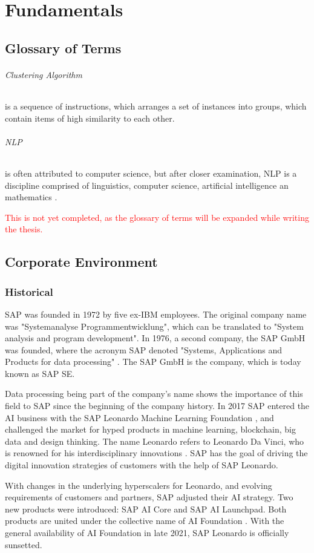 \chapter{Fundamentals}
\section{Glossary of Terms}

	\subparagraph{Clustering Algorithm} is a sequence of instructions, which arranges a set of instances into groups, which contain items of high similarity to each other.
	\subparagraph{\ac{NLP}}is often attributed to computer science, but after closer examination, \ac{NLP} is a discipline comprised of linguistics, computer science, artificial intelligence an mathematics \cite{chowdhury2003}.
	
	\textcolor{red}{This is not yet completed, as the glossary of terms will be expanded while writing the thesis.}
	

\section{Corporate Environment}

	\subsection{Historical}
	SAP was founded in 1972 by five ex-IBM employees. The original company name was "Systemanalyse Programmentwicklung", which can be translated to "System analysis and program development". In 1976, a second company, the SAP GmbH was founded, where the acronym SAP denoted "Systems, Applications and Products for data processing" \cite{GeschichteSAP1972}. The SAP GmbH is the company, which is today known as SAP SE. 
	
	Data processing being part of the company's name shows the importance of this field to SAP since the beginning of the company history.
	In 2017 SAP entered the AI business with the SAP Leonardo Machine Learning Foundation \cite{rutschmannSAPLeonardo2021}, and challenged the market for hyped products in machine learning, blockchain, big data and design thinking. The name Leonardo refers to Leonardo Da Vinci, who is renowned for his interdisciplinary innovations \cite{schmitzLeonardo}. SAP has the goal of driving the digital innovation strategies of customers with the help of SAP Leonardo.
	
	
	With changes in the underlying hyperscalers for Leonardo, and evolving requirements of customers and partners, SAP adjusted their AI strategy. Two new products were introduced: SAP AI Core and SAP AI Launchpad. Both products are united under the collective name of AI Foundation \cite{rutschmannSAPLeonardo2021}. With the general availability of AI Foundation in late 2021, SAP Leonardo is officially sunsetted.

